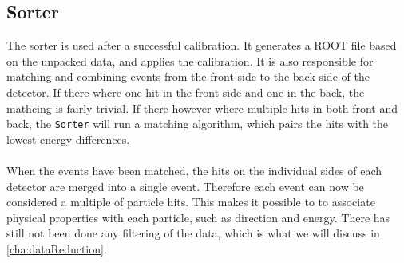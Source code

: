 \subsection{Sorter}
The sorter is used after a successful calibration. It generates a ROOT file based on the unpacked data, and applies the calibration. 
It is also responsible for matching and combining events from the front-side to the back-side of the detector. If there where one hit in the front side and one in the back, the mathcing is fairly trivial. If there however where multiple hits in both front and back, the \texttt{Sorter} will run a matching algorithm, which pairs the hits with the lowest energy differences. \\
\\
When the events have been matched, the hits on the individual sides of each detector are merged into a single event. 
Therefore each event can now be considered a multiple of particle hits. This makes it possible to to associate physical properties with each particle, such as direction and energy. 
There has still not been done any filtering of the data, which is what we will discuss in  \cref{cha:dataReduction}.


